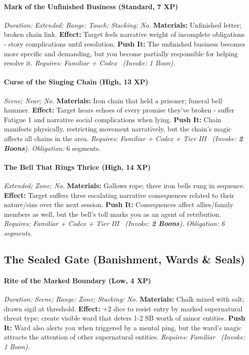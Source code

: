 \paragraph{Mark of the Unfinished Business (Standard, 7 XP)} \emph{Duration: Extended; Range: Touch; Stacking: No.}
\textbf{Materials:} Unfinished letter; broken chain link.
\textbf{Effect:} Target feels narrative weight of incomplete obligations - story complications until resolution.
\textbf{Push It:} The unfinished business becomes more specific and demanding, but you become partially responsible for helping resolve it.
\emph{Requires: Familiar + Codex \ (\textit{Invoke:} 1 Boon).}
\paragraph{Curse of the Singing Chain (High, 13 XP)} \emph{Scene; Near; No.}
\textbf{Materials:} Iron chain that held a prisoner; funeral bell hammer.
\textbf{Effect:} Target hears echoes of every promise they've broken - suffer Fatigue 1 and narrative social complications when lying.
\textbf{Push It:} Chain manifests physically, restricting movement narratively, but the chain's magic affects all chains in the area.
\emph{Requires: Familiar + Codex + Tier III \ (\textit{Invoke:} \textbf{2 Boons}).}
\emph{Obligation:} 6 segments.

\paragraph{The Bell That Rings Thrice (High, 14 XP)} \emph{Extended; Zone; No.}
\textbf{Materials:} Gallows rope; three iron bells rung in sequence.
\textbf{Effect:} Target suffers three escalating narrative consequences related to their nature/sins over the next session.
\textbf{Push It:} Consequences affect allies/family members as well, but the bell's toll marks you as an agent of retribution.
\emph{Requires: Familiar + Codex + Tier III \ (\textit{Invoke:} \textbf{2 Boons}).}
\emph{Obligation: 6 segments.}

\subsection{The Sealed Gate (Banishment, Wards \& Seals)}
\paragraph{Rite of the Marked Boundary (Low, 4 XP)} \emph{Duration: Scene; Range: Zone; Stacking: No.}
\textbf{Materials:} Chalk mixed with salt; drawn sigil at threshold.
\textbf{Effect:} +2 dice to resist entry by marked supernatural threat type; create visible ward that deters 1-2 SB worth of minor entities.
\textbf{Push It:} Ward also alerts you when triggered by a mental ping, but the ward's magic attracts the attention of other supernatural entities.
\emph{Requires: Familiar \ (\textit{Invoke:} 1 Boon).}
